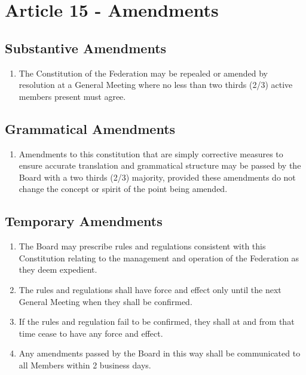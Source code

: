 \section{Article 15 - Amendments}
\label{article-15-amendments}

\subsection{Substantive Amendments}
\label{substantive-amendments}

\begin{enumerate}
 \item The Constitution of the Federation may be repealed or amended by resolution at a General Meeting where no less than two thirds (2/3) active members present must agree.
\end{enumerate}

\subsection{Grammatical Amendments}
\label{grammatical-amendments}

\begin{enumerate}
 \item Amendments to this constitution that are simply corrective measures to ensure accurate translation and grammatical structure may be passed by the Board with a two thirds (2/3) majority, provided these amendments do not change the concept or spirit of the point being amended.
\end{enumerate}

\subsection{Temporary Amendments}
\label{temporary-amendments}

\begin{enumerate}
 \item The Board may prescribe rules and regulations consistent with this Constitution relating to the management and operation of the Federation as they deem expedient.
 \item The rules and regulations shall have force and effect only until the next General Meeting when they shall be confirmed.
 \item If the rules and regulation fail to be confirmed, they shall at and from that time cease to have any force and effect.
 \item Any amendments passed by the Board in this way shall be communicated to all Members within 2 business days.
\end{enumerate}

